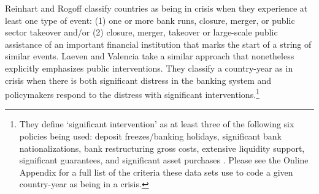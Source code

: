 \documentclass[]{article}
\begin{document}
Reinhart and Rogoff \citeyearpar[10]{Reinhart2009,ReinhartRog2010} classify countries as being in crisis when they experience at least one type of event: (1) one or more bank runs, closure, merger, or public sector takeover and/or (2) closure, merger, takeover or large-scale public assistance of an important financial institution that marks the start of a string of similar events. Laeven and Valencia \citeyearpar[228]{laeven2013} take a similar approach that nonetheless explicitly emphasizes public interventions. They classify a country-year as in crisis when there is both significant distress in the banking system and policymakers respond to the distress with significant interventions.\footnote{They define `significant intervention' as at least three of the following six policies being used: deposit freezes/banking holidays, significant bank nationalizations, bank restructuring gross costs, extensive liquidity support, significant guarantees, and significant asset purchases \cite[][229]{laeven2013}. Please see the Online Appendix for a full list of the criteria these data sets use to code a given country-year as being in a crisis.}
\end{document}

